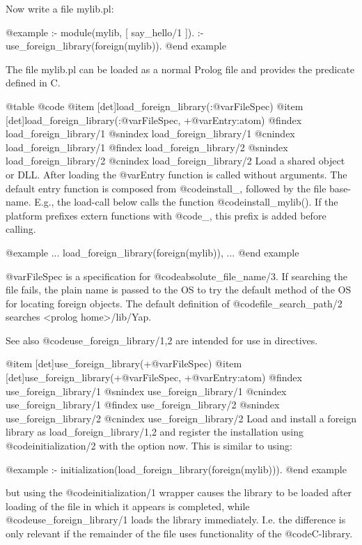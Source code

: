 {{{{{{{{{Now write a file mylib.pl:

@example
:- module(mylib, [ say_hello/1 ]).
:- use_foreign_library(foreign(mylib)).
@end example

The file mylib.pl can be loaded as a normal Prolog file and provides the predicate defined in C.

@table @code
@item [det]load_foreign_library(:@var{FileSpec})
@item [det]load_foreign_library(:@var{FileSpec}, +@var{Entry}:atom)
@findex load_foreign_library/1
@snindex load_foreign_library/1
@cnindex load_foreign_library/1
@findex load_foreign_library/2
@snindex load_foreign_library/2
@cnindex load_foreign_library/2
    Load a shared object or DLL. After loading the @var{Entry} function is
    called without arguments. The default entry function is composed
    from @code{install_}, followed by the file base-name. E.g., the
    load-call below calls the function @code{install_mylib()}. If the platform
    prefixes extern functions with @code{_}, this prefix is added before
    calling.

@example
          ...
          load_foreign_library(foreign(mylib)),
          ...
@end example

    @var{FileSpec} is a specification for
    @code{absolute_file_name/3}. If searching the file fails, the plain
    name is passed to the OS to try the default method of the OS for
    locating foreign objects. The default definition of
    @code{file_search_path/2} searches <prolog home>/lib/Yap.

    See also
        @code{use_foreign_library/1,2} are intended for use in
        directives. 

@item [det]use_foreign_library(+@var{FileSpec})
@item [det]use_foreign_library(+@var{FileSpec}, +@var{Entry}:atom)
@findex use_foreign_library/1
@snindex use_foreign_library/1
@cnindex use_foreign_library/1
@findex use_foreign_library/2
@snindex use_foreign_library/2
@cnindex use_foreign_library/2
    Load and install a foreign library as load_foreign_library/1,2 and
    register the installation using @code{initialization/2} with the option
    now. This is similar to using:

@example
    :- initialization(load_foreign_library(foreign(mylib))).
@end example

    but using the @code{initialization/1} wrapper causes the library to
    be loaded after loading of the file in which it appears is
    completed, while @code{use_foreign_library/1} loads the library
    immediately. I.e. the difference is only relevant if the remainder
    of the file uses functionality of the @code{C}-library. 

}}}}}}}}}
